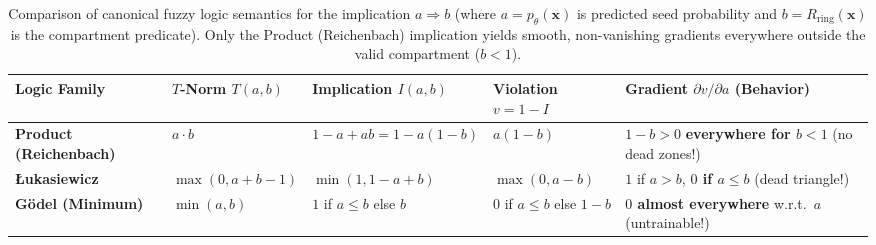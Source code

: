 \documentclass[10pt,a4paper]{article}
\renewcommand{\_}{\origunderscore\allowbreak}
\begin{document}
\begin{table}[htbp]
\centering
\caption[Canonical fuzzy logic $T$-norms, implications, and gradient behavior]{Comparison of canonical fuzzy logic semantics for the implication $a \Rightarrow b$ (where $a = p_\theta(\mathbf{x})$ is predicted seed probability and $b = R_{\text{ring}}(\mathbf{x})$ is the compartment predicate). Only the Product (Reichenbach) implication yields smooth, non-vanishing gradients everywhere outside the valid compartment ($b < 1$).}
\label{tab:tnorms_app}
{\footnotesize
\renewcommand{\arraystretch}{1.3}
\begin{tabularx}{\textwidth}{L{2.8cm} L{2.8cm} L{3.1cm} L{2.6cm} Y}
\toprule
{}\textbf{Logic Family} & \textbf{$T$-Norm $T(a,b)$} & \textbf{Implication $I(a,b)$} & \textbf{Violation $v = 1 - I$} & \textbf{Gradient $\partial v / \partial a$ (Behavior)} \\
\midrule
\textbf{Product (Reichenbach)} & $a \cdot b$ & $1 - a + a b = 1 - a(1 - b)$ & $a(1 - b)$ & $1 - b > 0$ \textbf{everywhere for $b < 1$} (no dead zones!) \\
\textbf{{\L}ukasiewicz} & $\max(0, a+b-1)$ & $\min(1, 1 - a + b)$ & $\max(0, a - b)$ & $1$ if $a > b$, \textbf{$0$ if $a \le b$} (dead triangle!) \\
\textbf{G\"odel (Minimum)} & $\min(a, b)$ & $1$ if $a \le b$ else $b$ & $0$ if $a \le b$ else $1-b$ & \textbf{$0$ almost everywhere} w.r.t.\ $a$ (untrainable!) \\
\bottomrule
\end{tabularx}
}
\end{table}
\end{document}
